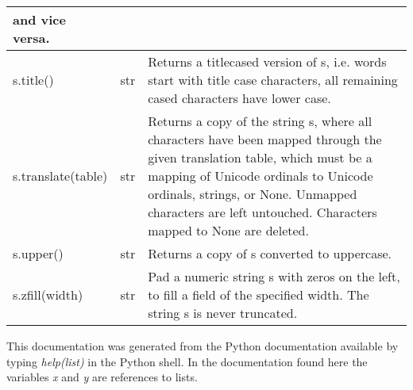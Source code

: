 \begin{center}
{\begin{tabular}{|l|c|p{2.2in}|}
       and vice versa. 
\\ \hline
       s.title() & str
&     
       Returns a titlecased version of s, i.e. words start with title case
       characters, all remaining cased characters have lower case.
\\ \hline
       s.translate(table) & str
&      
       Returns a copy of the string s, where all characters have been mapped
       through the given translation table, which must be a mapping of
       Unicode ordinals to Unicode ordinals, strings, or None.
       Unmapped characters are left untouched. Characters mapped to None
       are deleted.   
\\ \hline
       s.upper() & str
&      
       Returns a copy of s converted to uppercase.
\\ \hline
       s.zfill(width) & str
&      
       Pad a numeric string s with zeros on the left, to fill a field
       of the specified width. The string s is never truncated.
\\ \hline
\end{tabular}}
\end{center}

\newpage

\label{listmethods}

This documentation was generated from the Python documentation available by typing {\em help(list)} in the Python shell. In the documentation found here the variables {\em x} and {\em y} are references to lists. 

